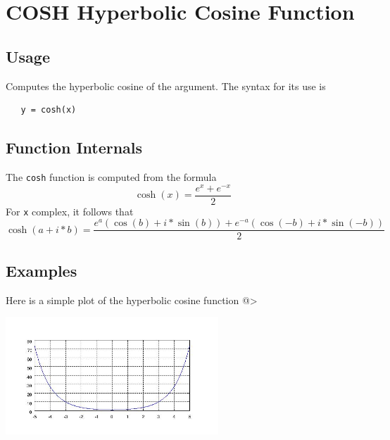 \section{COSH Hyperbolic Cosine Function}

\subsection{Usage}

Computes the hyperbolic cosine of the argument.
The syntax for its use is
\begin{verbatim}
   y = cosh(x)
\end{verbatim}
\subsection{Function Internals}

The \verb|cosh| function is computed from the formula
\[
   \cosh(x) = \frac{e^x+e^{-x}}{2}
\]
For \verb|x| complex, it follows that
\[
   \cosh(a+i*b) = \frac{e^a(\cos(b)+i*\sin(b)) + e^{-a}(\cos(-b)+i*\sin(-b))}{2}
\]
\subsection{Examples}

Here is a simple plot of the hyperbolic cosine function
@>


\centerline{\includegraphics[width=8cm]{coshplot}}


